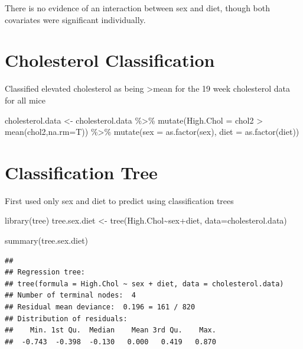 \documentclass[
]{article}
\newenvironment{Shaded}{\begin{snugshade}}{\end{snugshade}}
\newcommand{\AttributeTok}[1]{\textcolor[rgb]{0.77,0.63,0.00}{#1}}
\newcommand{\FunctionTok}[1]{\textcolor[rgb]{0.00,0.00,0.00}{#1}}
\newcommand{\NormalTok}[1]{#1}
\newcommand{\OtherTok}[1]{\textcolor[rgb]{0.56,0.35,0.01}{#1}}
\newcommand{\SpecialCharTok}[1]{\textcolor[rgb]{0.00,0.00,0.00}{#1}}
\begin{document}
There is no evidence of an interaction between sex and diet, though both
covariates were significant individually.

\hypertarget{cholesterol-classification}{%
\section{Cholesterol Classification}\label{cholesterol-classification}}

Classified elevated cholesterol as being \textgreater mean for the 19
week cholesterol data for all mice

\begin{Shaded}
\begin{Highlighting}[]
\NormalTok{cholesterol.data }\OtherTok{\textless{}{-}}
\NormalTok{  cholesterol.data }\SpecialCharTok{\%\textgreater{}\%}
  \FunctionTok{mutate}\NormalTok{(}\AttributeTok{High.Chol =}\NormalTok{ chol2 }\SpecialCharTok{\textgreater{}} \FunctionTok{mean}\NormalTok{(chol2,}\AttributeTok{na.rm=}\NormalTok{T)) }\SpecialCharTok{\%\textgreater{}\%}
  \FunctionTok{mutate}\NormalTok{(}\AttributeTok{sex =} \FunctionTok{as.factor}\NormalTok{(sex),}
         \AttributeTok{diet =} \FunctionTok{as.factor}\NormalTok{(diet))}
\end{Highlighting}
\end{Shaded}

\hypertarget{classification-tree}{%
\section{Classification Tree}\label{classification-tree}}

First used only sex and diet to predict using classification trees

\begin{Shaded}
\begin{Highlighting}[]
\FunctionTok{library}\NormalTok{(tree)}
\NormalTok{tree.sex.diet }\OtherTok{\textless{}{-}} \FunctionTok{tree}\NormalTok{(High.Chol}\SpecialCharTok{\textasciitilde{}}\NormalTok{sex}\SpecialCharTok{+}\NormalTok{diet, }\AttributeTok{data=}\NormalTok{cholesterol.data)}

\FunctionTok{summary}\NormalTok{(tree.sex.diet) }
\end{Highlighting}
\end{Shaded}

\begin{verbatim}
## 
## Regression tree:
## tree(formula = High.Chol ~ sex + diet, data = cholesterol.data)
## Number of terminal nodes:  4 
## Residual mean deviance:  0.196 = 161 / 820 
## Distribution of residuals:
##    Min. 1st Qu.  Median    Mean 3rd Qu.    Max. 
##  -0.743  -0.398  -0.130   0.000   0.419   0.870
\end{verbatim}
\end{document}
